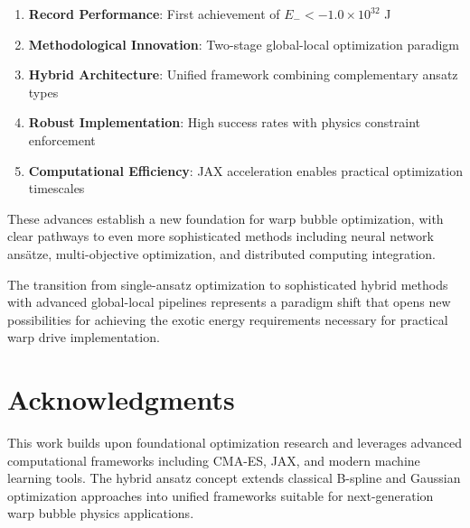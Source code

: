 \documentclass[11pt,a4paper]{article}
\begin{document}
\begin{enumerate}
\item \textbf{Record Performance}: First achievement of $E_- < -1.0 \times 10^{32}$ J
\item \textbf{Methodological Innovation}: Two-stage global-local optimization paradigm
\item \textbf{Hybrid Architecture}: Unified framework combining complementary ansatz types
\item \textbf{Robust Implementation}: High success rates with physics constraint enforcement
\item \textbf{Computational Efficiency}: JAX acceleration enables practical optimization timescales
\end{enumerate}

These advances establish a new foundation for warp bubble optimization, with clear pathways to even more sophisticated methods including neural network ansätze, multi-objective optimization, and distributed computing integration.

The transition from single-ansatz optimization to sophisticated hybrid methods with advanced global-local pipelines represents a paradigm shift that opens new possibilities for achieving the exotic energy requirements necessary for practical warp drive implementation.

\section*{Acknowledgments}

This work builds upon foundational optimization research and leverages advanced computational frameworks including CMA-ES, JAX, and modern machine learning tools. The hybrid ansatz concept extends classical B-spline and Gaussian optimization approaches into unified frameworks suitable for next-generation warp bubble physics applications.
\end{document}
